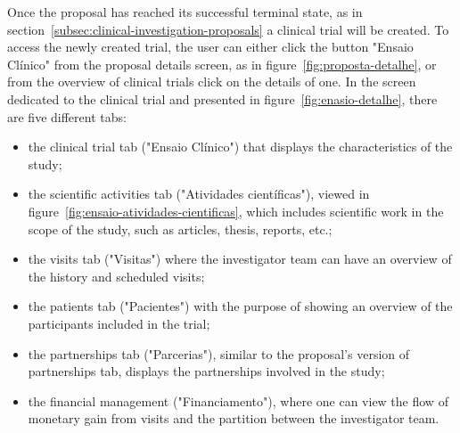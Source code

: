 Once the proposal has reached its successful terminal state, as in section~\ref{subsec:clinical-investigation-proposals} a clinical trial will be created. To access the newly created trial, the user can either click the button "Ensaio Clínico" from the proposal details screen, as in figure~\ref{fig:proposta-detalhe}, or from the overview of clinical trials click on the details of one.  
In the screen dedicated to the clinical trial and presented in figure~\ref{fig:enasio-detalhe}, there are five different tabs: 
\begin{itemize}
    \item the clinical trial tab ("Ensaio Clínico") that displays the characteristics of the study;
    \item the scientific activities tab ("Atividades científicas"), viewed in figure~\ref{fig:ensaio-atividades-cientificas}, which includes scientific work in the scope of the study, such as articles, thesis, reports, etc.;
    \item  the visits tab ("Visitas") where the investigator team can have an overview of the history and scheduled visits;
    \item the patients tab ("Pacientes") with the purpose of showing an overview of the participants included in the trial;
    \item the partnerships tab ("Parcerias"), similar to the proposal's version of partnerships tab, displays the partnerships involved in the study;
    \item the financial management ("Financiamento"), where one can view the flow of monetary gain from visits and the partition between the investigator team.
\end{itemize}

